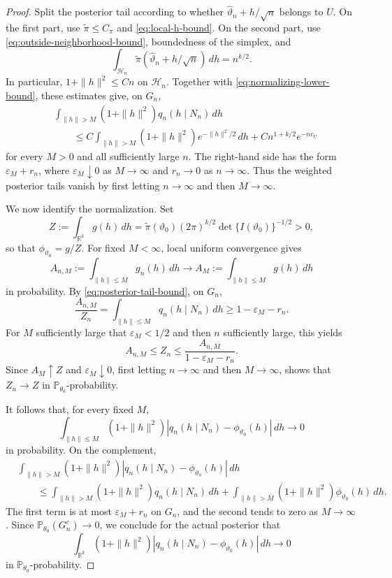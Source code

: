 \documentclass{article}
\theoremstyle{named}
\theoremstyle{named1}
\theoremstyle{plain}
\theoremstyle{remark}
\begin{document}
\begin{proof}
Split the posterior tail according to whether
$\widehat\vartheta_n+h/\sqrt n$ belongs to $U$. On the first part,
use $\widetilde\pi\leq C_\pi$ and \eqref{eq:local-h-bound}. On the
second part, use \eqref{eq:outside-neighborhood-bound}, boundedness of
the simplex, and
\[
    \int_{\mathcal H_n}
    \widetilde\pi(\widehat\vartheta_n+h/\sqrt n)\,dh
    =n^{k/2}.
\]
In particular, $1+\|h\|^2\leq Cn$ on $\mathcal H_n$. Together with
\eqref{eq:normalizing-lower-bound}, these estimates give, on $G_n$,
\begin{equation}
\begin{aligned}
    &\int_{\|h\|>M}(1+\|h\|^2)q_n(h\mid N_n)\,dh\\
    &\qquad\leq
    C\int_{\|h\|>M}(1+\|h\|^2)e^{-\|h\|^2/2}\,dh
    +Cn^{1+k/2}e^{-nc_U}
\end{aligned}
    \label{eq:posterior-tail-bound}
\end{equation}
for every $M>0$ and all sufficiently large $n$.
 The right-hand side
has the form $\varepsilon_M+r_n$, where $\varepsilon_M\downarrow0$
as $M\to\infty$ and $r_n\to0$ as $n\to\infty$. Thus the weighted
posterior tails vanish by first letting $n\to\infty$ and then
$M\to\infty$.

We now identify the normalization. Set
\[
    Z:=\int_{\mathbb R^k}g(h)\,dh
      =\widetilde\pi(\vartheta_0)(2\pi)^{k/2}
        \det\{I(\vartheta_0)\}^{-1/2}>0,
\]
so that $\phi_{\vartheta_0}=g/Z$. For fixed $M<\infty$, local uniform
convergence gives
\[
    A_{n,M}:=\int_{\|h\|\leq M}g_n(h)\,dh
    \rightarrow
    A_M:=\int_{\|h\|\leq M}g(h)\,dh
\]
in probability. By \eqref{eq:posterior-tail-bound}, on $G_n$,
\[
    \frac{A_{n,M}}{Z_n}
    =\int_{\|h\|\leq M}q_n(h\mid N_n)\,dh
    \geq1-\varepsilon_M-r_n.
\]
For $M$ sufficiently large that $\varepsilon_M<1/2$ and then $n$
sufficiently large, this yields
\[
    A_{n,M}\leq Z_n\leq\frac{A_{n,M}}{1-\varepsilon_M-r_n}.
\]
Since $A_M\uparrow Z$ and $\varepsilon_M\downarrow0$,
first letting $n\to\infty$ and then  $M\to\infty$, shows that
$Z_n\to Z$ in $\mathbb P_{\theta_0}$-probability.

It follows that, for every fixed $M$,
\[
    \int_{\|h\|\leq M}(1+\|h\|^2)
    |q_n(h\mid N_n)-\phi_{\vartheta_0}(h)|\,dh
    \rightarrow0
\]
in probability. On the complement,
\[
\begin{aligned}
    &\int_{\|h\|>M}(1+\|h\|^2)
      |q_n(h\mid N_n)-\phi_{\vartheta_0}(h)|\,dh\\
    &\qquad\leq
      \int_{\|h\|>M}(1+\|h\|^2)q_n(h\mid N_n)\,dh
      +\int_{\|h\|>M}(1+\|h\|^2)\phi_{\vartheta_0}(h)\,dh.
\end{aligned}
\]
The first term is at most $\varepsilon_M+r_n$ on $G_n$, and the second
tends to zero as $M\to\infty$. Since
$\mathbb P_{\theta_0}(G_n^c)\to0$, we conclude for the actual posterior
that
\begin{equation}
    \int_{\mathbb R^k}(1+\|h\|^2)
    |q_n(h\mid N_n)-\phi_{\vartheta_0}(h)|\,dh
    \rightarrow0
    \label{posterior-moment-conv}
\end{equation}
in $\mathbb P_{\theta_0}$-probability.


\end{proof}
\end{document}
